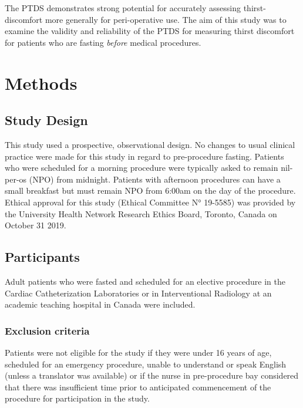 \documentclass[12pt,twoside,]{pinp}
\begin{document}
The PTDS demonstrates strong potential for accurately assessing
thirst-discomfort more generally for peri-operative use. The aim of this
study was to examine the validity and reliability of the PTDS for
measuring thirst discomfort for patients who are fasting \emph{before}
medical procedures.

\hypertarget{methods}{%
\section{Methods}\label{methods}}

\hypertarget{study-design}{%
\subsection{Study Design}\label{study-design}}

This study used a prospective, observational design. No changes to usual
clinical practice were made for this study in regard to pre-procedure
fasting. Patients who were scheduled for a morning procedure were
typically asked to remain nil-per-os (NPO) from midnight. Patients with
afternoon procedures can have a small breakfast but must remain NPO from
6:00am on the day of the procedure. Ethical approval for this study
(Ethical Committee N° 19-5585) was provided by the University Health
Network Research Ethics Board, Toronto, Canada on October 31 2019.

\hypertarget{participants}{%
\subsection{Participants}\label{participants}}

Adult patients who were fasted and scheduled for an elective procedure
in the Cardiac Catheterization Laboratories or in Interventional
Radiology at an academic teaching hospital in Canada were included.

\hypertarget{exclusion-criteria}{%
\subsubsection{Exclusion criteria}\label{exclusion-criteria}}

Patients were not eligible for the study if they were under 16 years of
age, scheduled for an emergency procedure, unable to understand or speak
English (unless a translator was available) or if the nurse in
pre-procedure bay considered that there was insufficient time prior to
anticipated commencement of the procedure for participation in the
study.
\end{document}
